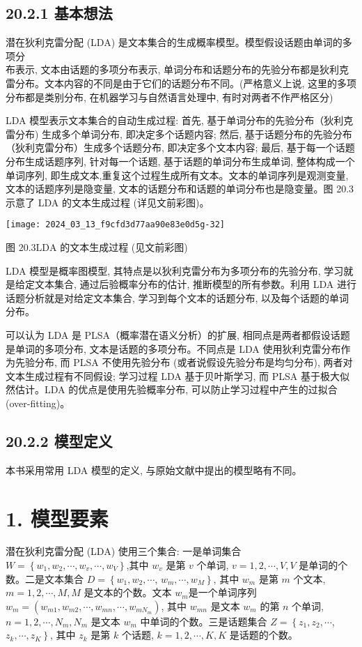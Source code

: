 \documentclass[10pt]{article}
\begin{document}
\begin{CJK*}{UTF8}{bsmi}
\subsection*{20.2.1 基本想法}
潜在狄利克雷分配 (LDA) 是文本集合的生成概率模型。模型假设话题由单词的多项分\\
布表示, 文本由话题的多项分布表示, 单词分布和话题分布的先验分布都是狄利克雷分布。文本内容的不同是由于它们的话题分布不同。(严格意义上说, 这里的多项分布都是类别分布, 在机器学习与自然语言处理中, 有时对两者不作严格区分)

LDA 模型表示文本集合的自动生成过程: 首先, 基于单词分布的先验分布（狄利克雷分布) 生成多个单词分布, 即决定多个话题内容; 然后, 基于话题分布的先验分布（狄利克雷分布）生成多个话题分布, 即决定多个文本内容; 最后, 基于每一个话题分布生成话题序列, 针对每一个话题, 基于话题的单词分布生成单词, 整体构成一个单词序列, 即生成文本,重复这个过程生成所有文本。文本的单词序列是观测变量, 文本的话题序列是隐变量, 文本的话题分布和话题的单词分布也是隐变量。图 20.3 示意了 LDA 的文本生成过程 (详见文前彩图)。

\begin{center}
\texttt{[image: 2024\_03\_13\_f9cfd3d77aa90e83e0d5g-32]}
\end{center}

图 $20.3 \mathrm{LDA}$ 的文本生成过程 (见文前彩图)

LDA 模型是概率图模型, 其特点是以狄利克雷分布为多项分布的先验分布, 学习就是给定文本集合, 通过后验概率分布的估计, 推断模型的所有参数。利用 LDA 进行话题分析就是对给定文本集合, 学习到每个文本的话题分布, 以及每个话题的单词分布。

可以认为 LDA 是 PLSA（概率潜在语义分析）的扩展, 相同点是两者都假设话题是单词的多项分布, 文本是话题的多项分布。不同点是 LDA 使用狄利克雷分布作为先验分布, 而 PLSA 不使用先验分布 (或者说假设先验分布是均匀分布), 两者对文本生成过程有不同假设; 学习过程 LDA 基于贝叶斯学习, 而 PLSA 基于极大似然估计。LDA 的优点是使用先验概率分布, 可以防止学习过程中产生的过拟合 (over-fitting)。

\subsection*{20.2.2 模型定义}
本书采用常用 LDA 模型的定义, 与原始文献中提出的模型略有不同。

\section*{1. 模型要素}
潜在狄利克雷分配 (LDA) 使用三个集合: 一是单词集合 $W=\left\{w_{1}, w_{2}, \cdots, w_{v}, \cdots, w_{V}\right\}$,其中 $w_{v}$ 是第 $v$ 个单词, $v=1,2, \cdots, V, V$ 是单词的个数。二是文本集合 $D=\left\{w_{1}, w_{2}, \cdots\right.$, $\left.w_{m}, \cdots, w_{M}\right\}$, 其中 $w_{m}$ 是第 $m$ 个文本, $m=1,2, \cdots, M, M$ 是文本的个数。文本 $w_{m}$是一个单词序列 $w_{m}=\left(w_{m 1}, w_{m 2}, \cdots, w_{m n}, \cdots, w_{m N_{m}}\right)$, 其中 $w_{m n}$ 是文本 $w_{m}$ 的第 $n$ 个单词, $n=1,2, \cdots, N_{m}, N_{m}$ 是文本 $w_{m}$ 中单词的个数。三是话题集合 $Z=\left\{z_{1}, z_{2}, \cdots\right.$, $\left.z_{k}, \cdots, z_{K}\right\}$, 其中 $z_{k}$ 是第 $k$ 个话题, $k=1,2, \cdots, K, K$ 是话题的个数。


\end{CJK*}
\end{document}
